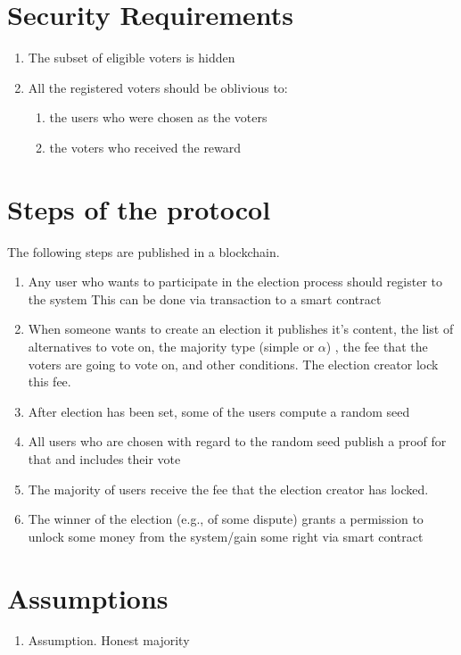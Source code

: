 \documentclass[]{article}
\begin{document}
\section{Security Requirements}
\begin{enumerate}
	\item The subset of eligible voters is hidden
	\item All the registered voters should be oblivious to:
		\begin{enumerate}
			\item the users who were chosen as the voters
			\item the voters who received the reward
		\end{enumerate}
\end{enumerate}


	\section{Steps of the protocol}
The following steps are published in a blockchain.
\begin{enumerate}
	\item Any user who wants to participate in the election process should register to the system This can be done via transaction to a smart contract
	\item When someone wants to create an election it publishes it's content, the list of alternatives to vote on, the majority type (simple or $\alpha$) , the fee that the voters are going to vote on, and other conditions. The election creator lock this fee.
	\item After election has been set, some of the users compute a random seed 
	\item All users who are chosen with regard to the random seed publish a proof for that and includes their vote
	\item The majority of users receive the fee that the election creator has locked. 
	\item The winner of the election (e.g., of some dispute) grants a permission to unlock some money from the system/gain some right via smart contract
\end{enumerate}
\section{Assumptions}
\begin{enumerate}
	\item Assumption. Honest majority
\end{enumerate}
\end{document}
